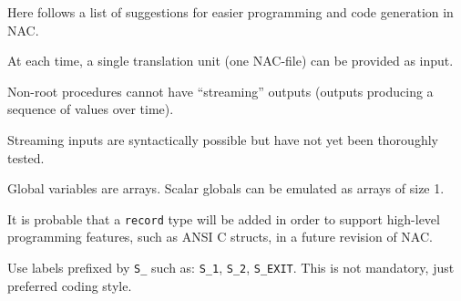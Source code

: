 \documentclass[a4paper]{article}
\begin{document}
Here follows a list of suggestions for easier programming and code generation in
NAC.
\setcounter{listcnt0}{0}
\begin{list}{.}
{
\setlength{\rightmargin}{\leftmargin}
}

\item At each time, a single translation unit (one NAC-file) can be provided as
input.

\item Non-root procedures cannot have ``streaming'' outputs (outputs producing a
sequence of values over time).

\item Streaming inputs are syntactically possible but have not yet been thoroughly
tested.

\item Global variables are arrays. Scalar globals can be emulated as arrays of
size 1.

\item It is probable that a \texttt{record} type will be added in order to support
high-level programming features, such as ANSI C structs, in a future revision
of NAC.

\item Use labels prefixed by \texttt{S\_} such as: \texttt{S\_1}, \texttt{S\_2}, \texttt{S\_EXIT}. This is
not mandatory, just preferred coding style.
\end{list}
\end{document}
